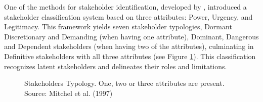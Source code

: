 \documentclass[authoryear,preprint,review,12pt]{elsarticle}
\begin{document}
    One of the methods for stakeholder identification, developed by \citet{Mitchell1997}, introduced a stakeholder classification system based on three attributes: Power, Urgency, and Legitimacy. This framework yields seven stakeholder typologies, Dormant  Discretionary and Demanding (when having one attribute), Dominant, Dangerous and Dependent stakeholders (when having two of the attributes), culminating in Definitive stakeholders with all three attributes (see Figure \ref{fig:graph1}). This classification recognizes latent stakeholders and delineates their roles and limitations.
    \begin{figure}[h]
        \centering
        \caption{Stakeholders Typology. One, two or three attributes are present. Source: Mitchel et al. (1997)}
        \label{fig:graph1}
    \end{figure}
\end{document}
